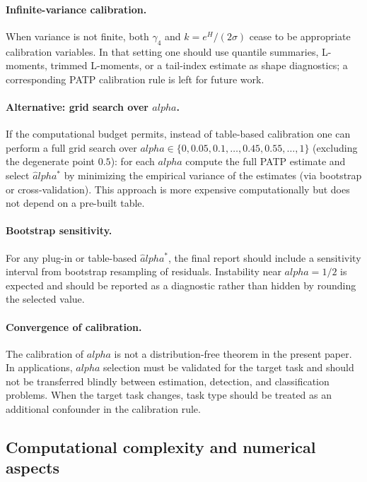 \documentclass[11pt]{article}
\def\alpha{alpha}%
\theoremstyle{definition}
\begin{document}
\paragraph{Infinite-variance calibration.}
When variance is not finite, both $\gamma_4$ and $k=e^H/(2\sigma)$ cease to
be appropriate calibration variables. In that setting one should use
quantile summaries, L-moments, trimmed L-moments, or a tail-index estimate
as shape diagnostics; a corresponding PATP calibration rule is left for
future work.

\paragraph{Alternative: grid search over $\alpha$.}
If the computational budget permits, instead of table-based calibration one
can perform a full grid search over $\alpha \in \{0, 0.05, 0.1,
\ldots, 0.45, 0.55, \ldots, 1\}$ (excluding the degenerate point $0.5$):
for each $\alpha$ compute the full PATP estimate and select $\hat\alpha^{*}$
by minimizing the empirical variance of the estimates (via bootstrap or
cross-validation). This approach is more expensive computationally but does
not depend on a pre-built table.

\paragraph{Bootstrap sensitivity.}
For any plug-in or table-based $\hat\alpha^*$, the final report should include
a sensitivity interval from bootstrap resampling of residuals. Instability
near $\alpha=1/2$ is expected and should be reported as a diagnostic rather
than hidden by rounding the selected value.

\paragraph{Convergence of calibration.}
The calibration of $\alpha$ is not a distribution-free theorem in the present
paper. In applications, $\alpha$ selection must be validated for the target
task and should not be transferred blindly between estimation, detection, and
classification problems. When the target task changes, task type should be
treated as an additional confounder in the calibration rule.

\subsection{Computational complexity and numerical aspects}\label{sec:alg:complexity}
\end{document}
